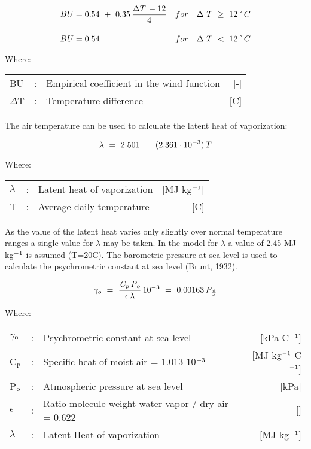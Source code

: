 \begin{align}
\label{eq:BU}
BU &= 0.54 ~+ ~0.35\,{\frac{\Delta T\, - 12}{4}} & for~~~\Delta ~ T~\ge ~ 12 \degrees C \\[1em]
\nonumber
BU &= 0.54 & for~~~\Delta ~ T~<~12 \degrees C
\end{align}

Where:\\[5pt]
\begin{tabularx}{\textwidth}{llXr}
	BU & :& Empirical coefficient in the wind function &  [-]\\
	$\Delta$T& :& Temperature difference & [\degrees C] \\
\end{tabularx}
\hspace*{6em}

The air temperature can be used to calculate the latent heat of vaporization: 

\begin{equation}
{\it \lambda} ~=~ 2.501~ -~ (2.361 \cdot 10^{-3} )\, T
\end{equation}

Where:\\[5pt]
\begin{tabularx}{\textwidth}{llXr}
	$\lambda$& :& Latent heat of vaporization & [MJ kg$^{{\rm -1}}$]\\
	T &:& Average daily temperature & [\degrees C]\\
\end{tabularx}


As the value of the latent heat varies only slightly over normal temperature ranges a
single value for $\lambda$ may be taken. In the model for $\lambda$ a value of 2.45 MJ 
kg$^{{\rm -1}}$ is assumed (T=20\degrees C). The barometric pressure at sea level is 
used to calculate the psychrometric constant at sea level (Brunt, 1932).

\begin{equation}
\gamma _{o} ~=~ {{\frac{\it C _{p} \, P _{o} }{{\it  \epsilon \, \lambda } }} }\, 10 ^{-3} ~=~ 0.00163\,{\it P} _{\frac{o}{\it \lambda}} 
\end{equation}

Where:\\[5pt]
\begin{tabularx}{\textwidth}{llXr}
	$\gamma$$_{{\rm o}}$ & :& Psychrometric constant at sea level & [kPa 
	\degrees C$^{{\rm -1}}$]\\
	C$_{{\rm p}}$ & :& Specific heat of moist air = 1.013 10$^{{\rm -3}}$ & [MJ kg$^{{\rm -1}}$ 
	\degrees C$^{{\rm -1}}$]\\
	P$_{{\rm o}}$ & :& Atmospheric pressure at sea level & [kPa]\\
	$\epsilon$ & :& Ratio molecule weight water vapor / dry air = 0.622 & []\\
	$\lambda$ & :& Latent Heat of vaporization & [MJ kg$^{{\rm -1}}$]\\
\end{tabularx}


